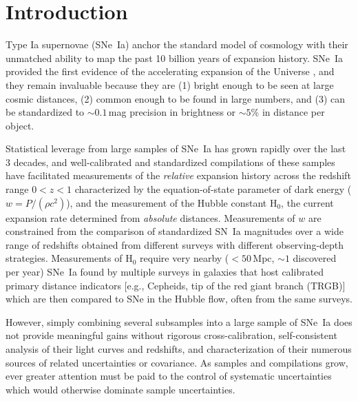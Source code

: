 \documentclass[twocolumn]{aastex63}
\begin{document}





\bigskip
\section{Introduction}






Type Ia supernovae (SNe~Ia) anchor the standard model of cosmology with their unmatched ability to map the past 10 billion years of expansion history.  
SNe~Ia provided the first evidence of the accelerating expansion of the Universe \citep{riess98,perlmutter99}, and they remain invaluable because they are (1) bright enough to be seen at large cosmic distances, (2) common enough to be found in large numbers, and (3) can be standardized to $\sim 0.1$\,mag precision in brightness {or $\sim 5$\% in distance per object.} 

Statistical leverage from large samples of SNe~Ia has grown rapidly over the last 3 decades, and well-calibrated and standardized compilations of these samples have facilitated measurements of the {\it relative} expansion history across the redshift range $0<z<1$ characterized by the equation-of-state parameter of dark energy ($w = P/(\rho c^2)$), and the measurement of the Hubble constant H$_0$, the current expansion rate {determined from {\it absolute} distances}. Measurements of $w$ are constrained from the comparison of standardized SN~Ia magnitudes over a wide range of redshifts obtained from different surveys with different observing-depth strategies. Measurements of H$_0$ require very nearby ($<50$\,Mpc, $\sim1$ discovered per year) SNe~Ia found by multiple surveys in galaxies that host calibrated primary distance indicators [e.g., Cepheids, tip of the red giant branch (TRGB)] which are then compared to SNe in the Hubble flow, often from the same surveys. 

However, simply combining several subsamples into a large sample of SNe~Ia does not provide meaningful gains without rigorous cross-calibration, self-consistent analysis of their light curves and redshifts, and characterization of their numerous sources of related uncertainties or covariance. As samples and compilations grow, ever greater attention must be paid to the control of systematic uncertainties which would otherwise dominate sample uncertainties. 
\end{document}
